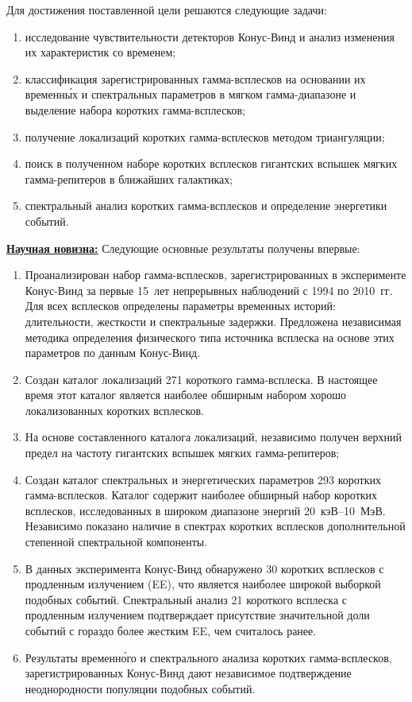 Для достижения поставленной цели решаются следующие задачи:
\begin{enumerate}
\item исследование чувствительности детекторов Конус-Винд и анализ изменения 
их характеристик со временем;
\item классификация зарегистрированных гамма-всплесков на основании их временн\'{ы}х 
и спектральных параметров в мягком гамма-диапазоне и выделение набора коротких гамма-всплесков; 
\item получение локализаций коротких гамма-всплесков методом триангуляции; 
\item поиск в полученном наборе коротких всплесков гигантских 
вспышек мягких гамма-репитеров в ближайших галактиках;
\item спектральный анализ коротких гамма-всплесков и определение энергетики событий.
\end{enumerate}

\underline{\textbf{Научная новизна:}}
Следующие основные результаты получены впервые:
\begin{enumerate}
\item Проанализирован набор гамма-всплесков, зарегистрированных в эксперименте 
 Конус-Винд за первые 15~лет непрерывных наблюдений с 1994 по 2010~гг. Для всех 
 всплесков определены параметры временных историй: длительности, жесткости и спектральные задержки.
 Предложена независимая методика определения физического типа источника всплеска на основе 
 этих параметров по данным Конус-Винд.
\item Создан каталог локализаций 271 короткого гамма-всплеска. В настоящее время 
 этот каталог является наиболее обширным набором хорошо локализованных коротких всплесков. 
\item На основе составленного каталога локализаций, независимо
 получен верхний предел на частоту гигантских вспышек мягких гамма-репитеров;
\item Создан каталог спектральных и энергетических параметров 293 коротких гамма-всплесков. 
 Каталог содержит наиболее обширный набор коротких всплесков, исследованных 
 в широком диапазоне энергий 20~кэВ--10~МэВ. 
 Независимо показано наличие в спектрах коротких всплесков дополнительной 
 степенной спектральной компоненты.
\item В данных эксперимента Конус-Винд обнаружено 30 коротких всплесков 
 с продленным излучением (EE), что является наиболее широкой выборкой подобных событий.
 Спектральный анализ 21 короткого всплеска с продленным излучением подтверждает 
 присутствие значительной доли событий с гораздо более жестким EE, чем считалось ранее.   
\item Результаты временн\'{о}го и спектрального анализа коротких гамма-всплесков, 
 зарегистрированных Конус-Винд дают независимое подтверждение неоднородности 
 популяции подобных событий.
\end{enumerate}

